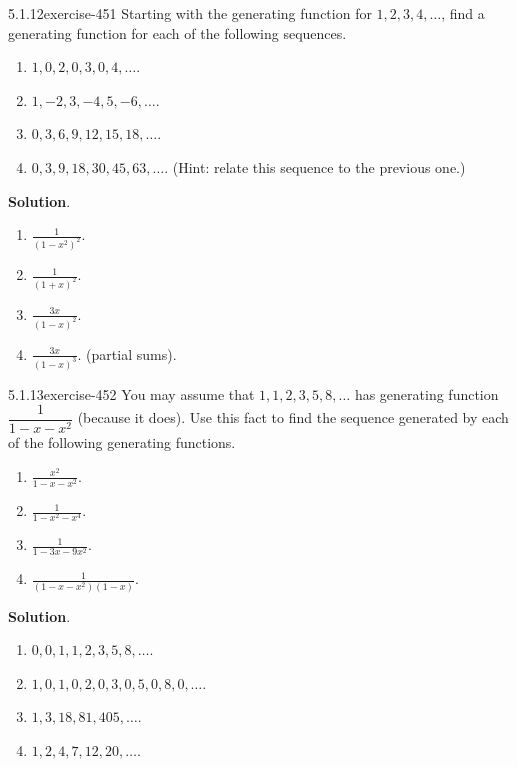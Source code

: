 \documentclass[twoside,11pt,]{book}
\numberwithin{equation}{chapter}
\begin{document}
\begin{divisionsolution}{5.1.12}{}{exercise-451}%
\hypertarget{p-5116}{}%
Starting with the generating function for \(1,2,3,4, \ldots\), find a generating function for each of the following sequences.\leavevmode%
\begin{enumerate}[label=(\alph*)]
\item\hypertarget{li-2460}{}\(1, 0, 2, 0, 3, 0, 4,\ldots\).%
\item\hypertarget{li-2461}{}\(1, -2, 3, -4, 5, -6, \ldots\).%
\item\hypertarget{li-2462}{}\(0, 3, 6, 9, 12, 15, 18, \ldots\).%
\item\hypertarget{li-2463}{}\(0, 3, 9, 18, 30, 45, 63,\ldots\). (Hint: relate this sequence to the previous one.)%
\end{enumerate}
%
\par\smallskip%
\noindent\textbf{Solution}.\quad%
\hypertarget{p-5117}{}%
\leavevmode%
\begin{enumerate}[label=(\alph*)]
\item\hypertarget{li-2464}{}\(\frac{1}{(1-x^2)^2}\).%
\item\hypertarget{li-2465}{}\(\frac{1}{(1+x)^2}\).%
\item\hypertarget{li-2466}{}\(\frac{3x}{(1-x)^2}\).%
\item\hypertarget{li-2467}{}\(\frac{3x}{(1-x)^3}\). (partial sums).%
\end{enumerate}
%
\end{divisionsolution}%
\begin{divisionsolution}{5.1.13}{}{exercise-452}%
\hypertarget{p-5118}{}%
You may assume that \(1, 1, 2, 3, 5, 8,\ldots\) has generating function \(\dfrac{1}{1-x-x^2}\) (because it does). Use this fact to find the sequence generated by each of the following generating functions.\leavevmode%
\begin{enumerate}[label=(\alph*)]
\item\hypertarget{li-2468}{}\(\frac{x^2}{1-x-x^2}\).%
\item\hypertarget{li-2469}{}\(\frac{1}{1-x^2-x^4}\).%
\item\hypertarget{li-2470}{}\(\frac{1}{1-3x-9x^2}\).%
\item\hypertarget{li-2471}{}\(\frac{1}{(1-x-x^2)(1-x)}\).%
\end{enumerate}
%
\par\smallskip%
\noindent\textbf{Solution}.\quad%
\hypertarget{p-5119}{}%
\leavevmode%
\begin{enumerate}[label=(\alph*)]
\item\hypertarget{li-2472}{}\(0,0,1,1,2,3,5,8, \ldots\).%
\item\hypertarget{li-2473}{}\(1, 0, 1, 0, 2, 0, 3, 0, 5, 0, 8, 0, \ldots\).%
\item\hypertarget{li-2474}{}\(1, 3, 18, 81, 405, \ldots\).%
\item\hypertarget{li-2475}{}\(1, 2, 4, 7, 12, 20, \ldots\).%
\end{enumerate}
%
\end{divisionsolution}%
\end{document}
